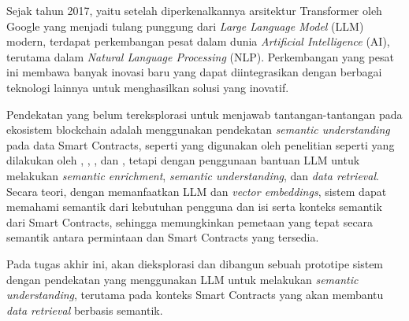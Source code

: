 Sejak tahun 2017, yaitu setelah diperkenalkannya arsitektur Transformer oleh Google yang menjadi tulang punggung dari \textit{Large Language Model} (LLM) modern, terdapat perkembangan pesat dalam dunia \textit{Artificial Intelligence} (AI), terutama dalam \textit{Natural Language Processing} (NLP). Perkembangan yang pesat ini membawa banyak inovasi baru yang dapat diintegrasikan dengan berbagai teknologi lainnya untuk menghasilkan solusi yang inovatif.

Pendekatan yang belum tereksplorasi untuk menjawab tantangan-tantangan pada ekosistem blockchain adalah menggunakan pendekatan \textit{semantic understanding} pada data Smart Contracts, seperti yang digunakan oleh penelitian seperti yang dilakukan oleh \cite{third2017linked}, \cite{shi2021semantic}, \cite{stan}, dan \cite{sopek2018graphchain}, tetapi dengan penggunaan bantuan LLM untuk melakukan \textit{semantic enrichment}, \textit{semantic understanding}, dan \textit{data retrieval}. Secara teori, dengan memanfaatkan LLM dan \textit{vector embeddings}, sistem dapat memahami semantik dari kebutuhan pengguna dan isi serta konteks semantik dari Smart Contracts, sehingga memungkinkan pemetaan yang tepat secara semantik antara permintaan dan Smart Contracts yang tersedia.


Pada tugas akhir ini, akan dieksplorasi dan dibangun sebuah prototipe sistem dengan pendekatan yang menggunakan LLM untuk melakukan \textit{semantic understanding}, terutama pada konteks Smart Contracts yang akan membantu \textit{data retrieval} berbasis semantik.



